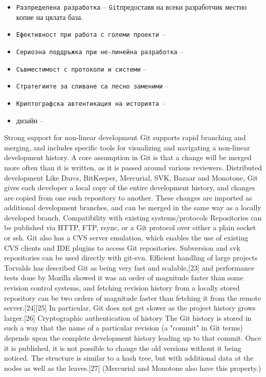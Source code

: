 \documentclass[a4paper]{article}
\def\git{\texttt{Git}}
\begin{document}
    \begin{itemize}
      \item \texttt{Разпределена разработка} -- \git предоставя на всеки разработчик местно копие на цялата база.
      \item \texttt{Ефективност при работа с големи проекти} --
      \item \texttt{Сериозна поддръжка при не-линейна разработка} --
      \item \texttt{Съвместимост с протоколи и системи} --
      \item \texttt{Стратегиите за сливане са лесно заменими} --
      \item \texttt{Криптографска автентикация на историята} --
      \item {} дизайн{} --
    \end{itemize}
    Strong support for non-linear development
    Git supports rapid branching and merging, and includes specific tools for visualizing and navigating a non-linear development history. A core assumption in Git is that a change will be merged more often than it is written, as it is passed around various reviewers.
    Distributed development
    Like Darcs, BitKeeper, Mercurial, SVK, Bazaar and Monotone, Git gives each developer a local copy of the entire development history, and changes are copied from one such repository to another. These changes are imported as additional development branches, and can be merged in the same way as a locally developed branch.
    Compatibility with existing systems/protocols
    Repositories can be published via HTTP, FTP, rsync, or a Git protocol over either a plain socket or ssh. Git also has a CVS server emulation, which enables the use of existing CVS clients and IDE plugins to access Git repositories. Subversion and svk repositories can be used directly with git-svn.
    Efficient handling of large projects
    Torvalds has described Git as being very fast and scalable,[23] and performance tests done by Mozilla showed it was an order of magnitude faster than some revision control systems, and fetching revision history from a locally stored repository can be two orders of magnitude faster than fetching it from the remote server.[24][25] In particular, Git does not get slower as the project history grows larger.[26]
    Cryptographic authentication of history
    The Git history is stored in such a way that the name of a particular revision (a "commit" in Git terms) depends upon the complete development history leading up to that commit. Once it is published, it is not possible to change the old versions without it being noticed. The structure is similar to a hash tree, but with additional data at the nodes as well as the leaves.[27] (Mercurial and Monotone also have this property.)
\end{document}
